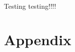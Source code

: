 \documentclass[
  utf8,%
  largesmallcaps,intlimits,widermath,%
  sharecounter,nobreak,definition=marks,%
  noparts%
]{rtthesis/rtthesis}
\begin{document}
\frontmatter
\maketitle

\begin{abstract}[english]
  
\end{abstract}



\tableofcontents
Testing testing!!!!
\printglossaries[type=\acronymtype]


\mainmatter%





\part*{Appendix}
\appendix


\clearemptydoublepage%

\backmatter%



\printindex
\end{document}
